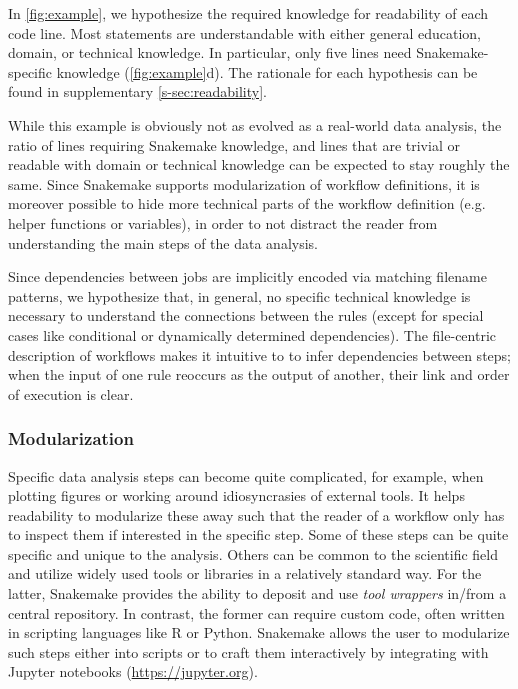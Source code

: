 \documentclass[parskip=half, DIV=18]{scrartcl}
\let\plainurl\url
\renewcommand{\url}[1]{\protect\plainurl{#1}}
\begin{document}
In \autoref{fig:example}, we hypothesize the required knowledge for readability of each code line.
Most statements are understandable with either general education, domain, or technical knowledge.
In particular, only five lines need Snakemake-specific knowledge (\autoref{fig:example}d).
The rationale for each hypothesis can be found in supplementary \autoref{s-sec:readability}.

While this example is obviously not as evolved as a real-world data analysis, the ratio of lines requiring Snakemake knowledge, and lines that are trivial or readable with domain or technical knowledge can be expected to stay roughly the same.
Since Snakemake supports modularization of workflow definitions, it is moreover possible to hide more technical parts of the workflow definition (e.g. helper functions or variables), in order to not distract the reader from understanding the main steps of the data analysis.

Since dependencies between jobs are implicitly encoded via matching filename patterns, we hypothesize that, in general, no specific technical knowledge is necessary to understand the connections between the rules (except for special cases like conditional or dynamically determined dependencies). 
The file-centric description of workflows makes it intuitive to to infer dependencies between steps; when the input of one rule reoccurs as the output of another, their link and order of execution is clear.

\subsubsection{Modularization}\label{sec:modularization}

Specific data analysis steps can become quite complicated, for example, when plotting figures or working around idiosyncrasies of external tools.
It helps readability to modularize these away such that the reader of a workflow only has to inspect them if interested in the specific step.
Some of these steps can be quite specific and unique to the analysis.
Others can be common to the scientific field and utilize widely used tools or libraries in a relatively standard way.
For the latter, Snakemake provides the ability to deposit and use \emph{tool wrappers} in/from a central repository.
In contrast, the former can require custom code, often written in scripting languages like R or Python.
Snakemake allows the user to modularize such steps either into scripts or to craft them interactively by integrating with Jupyter notebooks (\url{https://jupyter.org}).
\end{document}
